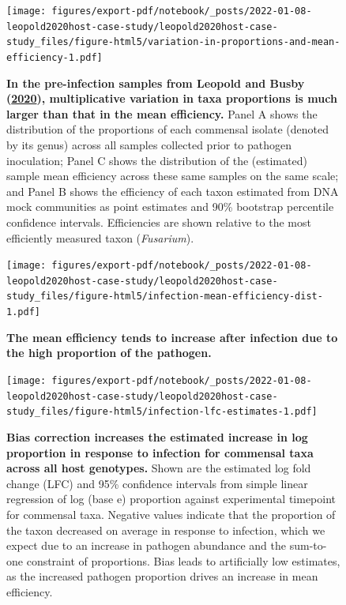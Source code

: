 \documentclass[
]{article}
\begin{document}
\begin{figure}
\centering
\texttt{[image: figures/export-pdf/notebook/\_posts/2022-01-08-leopold2020host-case-study/leopold2020host-case-study\_files/figure-html5/variation-in-proportions-and-mean-efficiency-1.pdf]}
\caption{\label{fig:leopold2020host-variation}\textbf{In the pre-infection samples from Leopold and Busby (\protect\hyperlink{ref-leopold2020host}{2020}), multiplicative variation in taxa proportions is much larger than that in the mean efficiency.} Panel A shows the distribution of the proportions of each commensal isolate (denoted by its genus) across all samples collected prior to pathogen inoculation; Panel C shows the distribution of the (estimated) sample mean efficiency across these same samples on the same scale; and Panel B shows the efficiency of each taxon estimated from DNA mock communities as point estimates and 90\% bootstrap percentile confidence intervals. Efficiencies are shown relative to the most efficiently measured taxon (\emph{Fusarium}).}
\end{figure}



\begin{figure}
\centering
\texttt{[image: figures/export-pdf/notebook/\_posts/2022-01-08-leopold2020host-case-study/leopold2020host-case-study\_files/figure-html5/infection-mean-efficiency-dist-1.pdf]}
\caption{\label{fig:leopold2020host-infection-mean-efficiency-dist}\textbf{The mean efficiency tends to increase after infection due to the high proportion of the pathogen.}}
\end{figure}



\begin{figure}
\centering
\texttt{[image: figures/export-pdf/notebook/\_posts/2022-01-08-leopold2020host-case-study/leopold2020host-case-study\_files/figure-html5/infection-lfc-estimates-1.pdf]}
\caption{\label{fig:leopold2020host-infection-lfc}\textbf{Bias correction increases the estimated increase in log proportion in response to infection for commensal taxa across all host genotypes.} Shown are the estimated log fold change (LFC) and 95\% confidence intervals from simple linear regression of log (base e) proportion against experimental timepoint for commensal taxa. Negative values indicate that the proportion of the taxon decreased on average in response to infection, which we expect due to an increase in pathogen abundance and the sum-to-one constraint of proportions. Bias leads to artificially low estimates, as the increased pathogen proportion drives an increase in mean efficiency.}
\end{figure}
\end{document}
